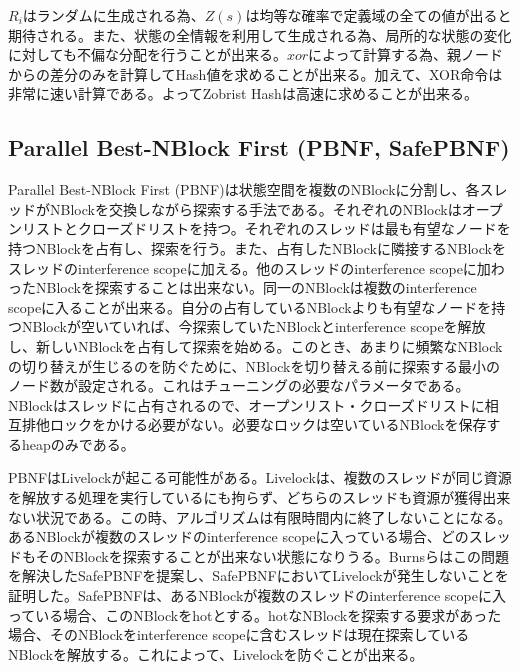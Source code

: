 \documentclass{jsarticle}
\begin{document}
$R_{i}$はランダムに生成される為、$Z(s)$は均等な確率で定義域の全ての値が出ると期待される。また、状態の全情報を利用して生成される為、局所的な状態の変化に対しても不偏な分配を行うことが出来る。$xor$によって計算する為、親ノードからの差分のみを計算してHash値を求めることが出来る。加えて、XOR命令は非常に速い計算である。よってZobrist Hashは高速に求めることが出来る。



\subsection{Parallel Best-NBlock First (PBNF, SafePBNF)}
Parallel Best-NBlock First (PBNF)は状態空間を複数のNBlockに分割し、各スレッドがNBlockを交換しながら探索する手法である\cite{Burns2010}。それぞれのNBlockはオープンリストとクローズドリストを持つ。それぞれのスレッドは最も有望なノードを持つNBlockを占有し、探索を行う。また、占有したNBlockに隣接するNBlockをスレッドのinterference scopeに加える。他のスレッドのinterference scopeに加わったNBlockを探索することは出来ない。同一のNBlockは複数のinterference scopeに入ることが出来る。自分の占有しているNBlockよりも有望なノードを持つNBlockが空いていれば、今探索していたNBlockとinterference scopeを解放し、新しいNBlockを占有して探索を始める。このとき、あまりに頻繁なNBlockの切り替えが生じるのを防ぐために、NBlockを切り替える前に探索する最小のノード数が設定される。これはチューニングの必要なパラメータである。NBlockはスレッドに占有されるので、オープンリスト・クローズドリストに相互排他ロックをかける必要がない。必要なロックは空いているNBlockを保存するheapのみである。
\newline

PBNFはLivelockが起こる可能性がある。Livelockは、複数のスレッドが同じ資源を解放する処理を実行しているにも拘らず、どちらのスレッドも資源が獲得出来ない状況である。この時、アルゴリズムは有限時間内に終了しないことになる。あるNBlockが複数のスレッドのinterference scopeに入っている場合、どのスレッドもそのNBlockを探索することが出来ない状態になりうる。Burnsらはこの問題を解決したSafePBNFを提案し、SafePBNFにおいてLivelockが発生しないことを証明した。SafePBNFは、あるNBlockが複数のスレッドのinterference scopeに入っている場合、このNBlockをhotとする。hotなNBlockを探索する要求があった場合、そのNBlockをinterference scopeに含むスレッドは現在探索しているNBlockを解放する。これによって、Livelockを防ぐことが出来る。
\newline
\end{document}
